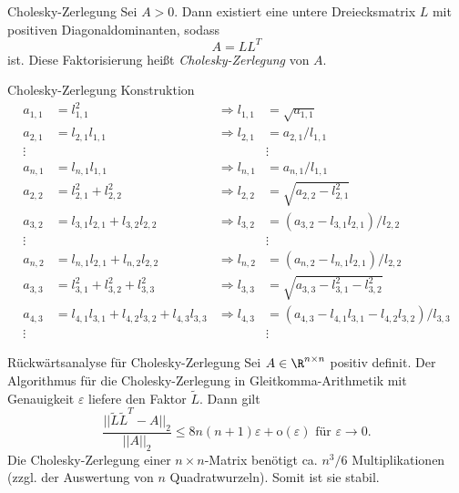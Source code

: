 \begin{karte}{Cholesky-Zerlegung}
    Sei \( A > 0 \). Dann existiert eine untere Dreiecksmatrix \( L \) mit positiven Diagonaldominanten, sodass 
    \[ A = L L^T \]
    ist. Diese Faktorisierung heißt \textit{Cholesky-Zerlegung} von \(A\).
\end{karte}

\begin{karte}{Cholesky-Zerlegung Konstruktion}
    \begin{align*}
        a_{1,1} &= l_{1,1}^2 &\Longrightarrow l_{1,1} &= \sqrt{a_{1,1}} \\
        a_{2,1} &= l_{2,1} l_{1,1} &\Longrightarrow l_{2,1} &= a_{2,1} / l_{1,1} \\
        \vdots &&&\vdots \\
        a_{n,1} &= l_{n,1} l_{1,1} &\Longrightarrow l_{n,1} &= a_{n,1} / l_{1,1} \\
        a_{2,2} &= l_{2,1}^2 + l_{2,2}^2 &\Longrightarrow l_{2,2} &= \sqrt{a_{2,2} - l_{2,1}^2} \\
        a_{3,2} &= l_{3,1} l_{2,1} + l_{3,2} l_{2,2} &\Longrightarrow l_{3,2} &= (a_{3,2} - l_{3,1} l_{2,1})/l_{2,2} \\
        \vdots &&& \vdots \\
        a_{n,2} &= l_{n,1}l_{2,1} + l_{n,2}l_{2,2} &\Longrightarrow l_{n,2} &= (a_{n,2} - l_{n,1}l_{2,1})/l_{2,2} \\
        a_{3,3} &= l_{3,1}^2 + l_{3,2}^2 + l_{3,3}^2 &\Longrightarrow l_{3,3} &= \sqrt{a_{3,3} - l_{3,1}^2 - l_{3,2}^2} \\
        a_{4,3} &= l_{4,1}l_{3,1} + l_{4,2} l_{3,2} + l_{4,3} l_{3,3} &\Longrightarrow l_{4,3} &= (a_{4,3} - l_{4,1} l_{3,1} - l_{4,2} l_{3,2}) / l_{3,3} \\
        \vdots &&& \vdots
    \end{align*}
\end{karte}

\begin{karte}{Rückwärtsanalyse für Cholesky-Zerlegung}
    Sei \( A \in \R^{n\times n} \) positiv definit. Der Algorithmus für die Cholesky-Zerlegung in 
    Gleitkomma-Arithmetik mit Genauigkeit \( \varepsilon \) liefere den Faktor \( \tilde{L} \). 
    Dann gilt 
    \[ \frac{ ||\tilde{L}\tilde{L}^T - A||_2 }{ ||A||_2 } \leq 8 n (n+1)\varepsilon + \mathrm{o}(\varepsilon) \text{ für } \varepsilon \rightarrow 0. \]
    Die Cholesky-Zerlegung einer \( n\times n \)-Matrix benötigt ca. \( n^3/6 \) Multiplikationen 
    (zzgl. der Auswertung von \(n\) Quadratwurzeln). Somit ist sie stabil.
\end{karte}

